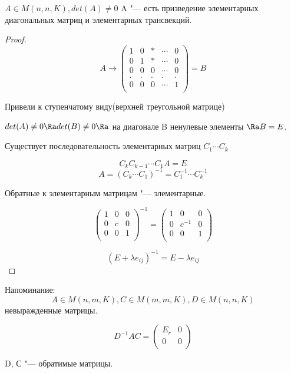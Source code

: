 \begin{theorem}{}
$A \in M(n, n, K), det(A) \ne 0$
A "--- есть призведение элементарных диагональных матриц и элементарных трансвекций. 
\end{theorem}
\begin{proof}
$$
A \to 
\begin{pmatrix}
1&0&*&\cdots&0\\
0&1&*&\cdots&0\\
0&0&0&\cdots&0\\
.&.&.&.&.\\
0&0&0&\cdots&1\\
\end{pmatrix}
= B
$$

Привели к ступенчатому виду(верхней треугольной матрице)

$det(A) \ne 0 \Ra det(B) \ne 0 \Ra $ на диагонале B ненулевые элементы $\Ra B = E$.

Существует последовательность элементарных матриц $C_1 \cdots C_k$

$$C_kC_{k - 1}\cdots C_{1} A = E$$
$$A = (C_k \cdots C_1)^{-1} = C_1^{-1} \cdots C_{k}^{-1}$$

Обратные к элементарным матрицам "--- элементарные. 

$$
\begin{pmatrix}
1&0&0\\
0&c&0\\
0&0&1\\
\end{pmatrix}^{-1} 
=
\begin{pmatrix}
1&0&0\\
0&c^{-1}&0\\
0&0&1\\
\end{pmatrix} 
$$

$$
(E + \lambda e_{ij})^{-1} = E - \lambda e_{ij}
$$
\end{proof}

Напоминание:
$$A \in M(n, m, K), C \in M(m, m, K), D \in M(n, n, K)$$
невыражденные матрицы. 

$$D^{-1}AC = 
\begin{pmatrix}
E_{r}&0\\
0&0\\
\end{pmatrix}$$
                 
D, С "--- обратимые матрицы.

